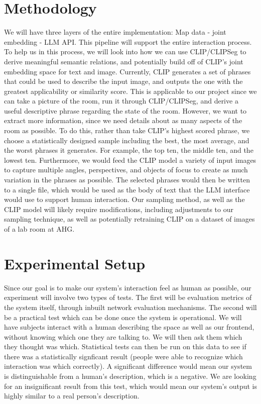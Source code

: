 \documentclass[letterpaper, 10 pt, conference]{ieeeconf}  %
\begin{document}
\section{Methodology}
    We will have three layers of the entire implementation: Map data - joint embedding - LLM API. This pipeline will support the entire interaction process. To help us in this process, we will look into how we can use CLIP/CLIPSeg to derive meaningful semantic relations, and potentially build off of CLIP's joint embedding space for text and image. Currently, CLIP generates a set of phrases that could be used to describe the input image, and outputs the one with the greatest applicability or similarity score. This is applicable to our project since we can take a picture of the room, run it through CLIP/CLIPSeg, and derive a useful descriptive phrase regarding the state of the room. However, we want to extract more information, since we need details about as many aspects of the room as possible. To do this, rather than take CLIP's highest scored phrase, we choose a statistically designed sample including the best, the most average, and the worst phrases it generates. For example, the top ten, the middle ten, and the lowest ten. Furthermore, we would feed the CLIP model a variety of input images to capture multiple angles, perspectives, and objects of focus to create as much variation in the phrases as possible. The selected phrases would then be written to a single file, which would be used as the body of text that the LLM interface would use to support human interaction. Our sampling method, as well as the CLIP model will likely require modifications, including adjustments to our sampling technique, as well as potentially retraining CLIP on a dataset of images of a lab room at AHG.


\section{Experimental Setup}
    Since our goal is to make our system's interaction feel as human as possible, our experiment will involve two types of tests. The first will be evaluation metrics of the system itself, through inbuilt network evaluation mechanisms. The second will be a practical test which can be done once the system is operational. We will have subjects interact with a human describing the space as well as our frontend, without knowing which one they are talking to. We will then ask them which they thought was which. Statistical tests can then be run on this data to see if there was a statistically signficant result (people were able to recognize which interaction was which correctly). A significant difference would mean our system is distinguishable from a human's description, which is a negative. We are looking for an insignificant result from this test, which would mean our system's output is highly similar to a real person's description. 
\end{document}
